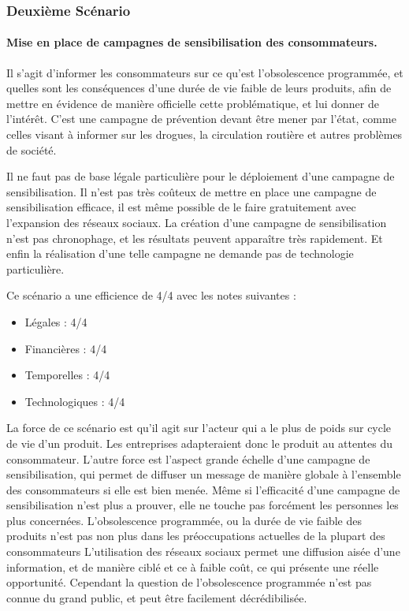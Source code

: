 \subsubsection{Deuxième Scénario}

\paragraph{Mise en place de campagnes de sensibilisation des consommateurs.}

\medbreak
Il s’agit d’informer les consommateurs sur ce qu’est l’obsolescence programmée, et quelles sont les conséquences d’une durée de vie faible de leurs produits, afin de mettre en évidence de manière officielle cette problématique, et lui donner de l'intérêt. C’est une campagne de prévention devant être mener par l’état, comme celles visant à informer sur les drogues, la circulation routière et autres problèmes de société.

\medbreak
Il ne faut pas de base légale particulière pour le déploiement d’une campagne de sensibilisation.
Il n’est pas très coûteux de mettre en place une campagne de sensibilisation efficace, il est même possible de le faire gratuitement avec l'expansion des réseaux sociaux.
La création d’une campagne de sensibilisation n’est pas chronophage, et les résultats peuvent apparaître très rapidement.
Et enfin la réalisation d’une telle campagne ne demande pas de technologie particulière.

Ce scénario a une efficience de 4/4 avec les notes suivantes :
\begin{itemize}
\item Légales : 4/4
\item Financières : 4/4
\item Temporelles : 4/4
\item Technologiques : 4/4
\end{itemize}


\medbreak
La force de ce scénario est qu’il agit sur l’acteur qui a le plus de poids sur cycle de vie d’un produit. Les entreprises adapteraient donc le produit au attentes du consommateur. L’autre force est l’aspect grande échelle d’une campagne de sensibilisation, qui permet de diffuser un message de manière globale à l’ensemble des consommateurs si elle est bien menée.
\medbreak
Même si l’efficacité d’une campagne de sensibilisation n’est plus a prouver, elle ne touche pas forcément les personnes les plus concernées. L'obsolescence programmée, ou la durée de vie faible des produits n’est pas non plus dans les préoccupations actuelles de la plupart des consommateurs
\medbreak
L’utilisation des réseaux sociaux permet une diffusion aisée d’une information, et de manière ciblé et ce à faible coût, ce qui présente une réelle opportunité.
\medbreak
Cependant la question de l’obsolescence programmée n’est pas connue du grand public, et peut être facilement décrédibilisée.